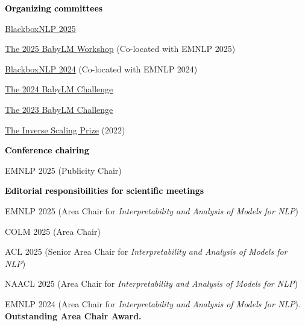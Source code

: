 \documentclass[10pt]{article}
\renewcommand{\subsection}[1]{\textcolor{black}{#1}}
\newcommand{\halfblankline}{\quad\vspace{-0.5\baselineskip}\pagebreak[3]}
\providecommand*\titlelink[2]{\href{#1}{\textcolor{accent}{#2}}}
\begin{document}
	\subsection{\textbf{Organizing committees}}
	\begin{innerlist}[itemsep=0pt]
	\item \titlelink{https://blackboxnlp.github.io}{BlackboxNLP 2025}
	\item \titlelink{https://babylm.github.io}{The 2025 BabyLM Workshop} (Co-located with EMNLP 2025)
	\item \titlelink{https://blackboxnlp.github.io}{BlackboxNLP 2024} (Co-located with EMNLP 2024)
	\item \titlelink{https://babylm.github.io}{The 2024 BabyLM Challenge}
	\item \titlelink{https://babylm.github.io/archive_2023.html}{The 2023 BabyLM Challenge}
	\item \titlelink{https://github.com/inverse-scaling/prize}{The Inverse Scaling Prize} (2022)
	\end{innerlist}

	\halfblankline

	\subsection{\textbf{Conference chairing}}
	\begin{innerlist}[itemsep=0pt]
	\item EMNLP 2025 (Publicity Chair)
	\end{innerlist}

	\halfblankline

	\subsection{\textbf{Editorial responsibilities for scientific meetings}}
	\begin{innerlist}[itemsep=0pt]
	
	\item EMNLP 2025 (Area Chair for \emph{Interpretability and Analysis of Models for NLP})
	\item COLM 2025 (Area Chair)
	\item ACL 2025 (Senior Area Chair for \emph{Interpretability and Analysis of Models for NLP})
	\item NAACL 2025 (Area Chair for \emph{Interpretability and Analysis of Models for NLP})
	\item EMNLP 2024 (Area Chair for \emph{Interpretability and Analysis of Models for NLP}). \textbf{Outstanding Area Chair Award.}
	\end{innerlist}
\end{document}
